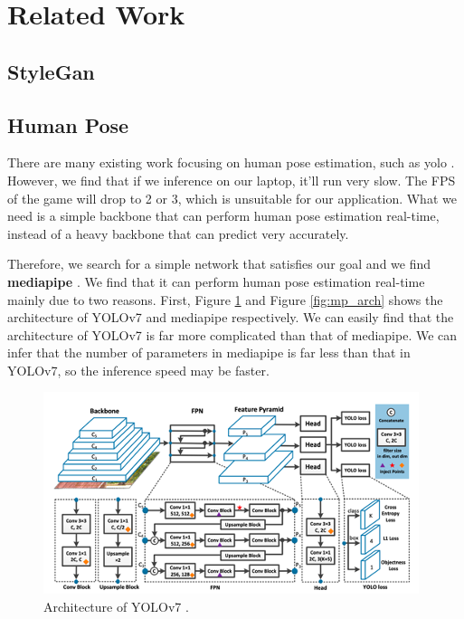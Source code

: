\section{Related Work}
\subsection{StyleGan}

\subsection{Human Pose}
There are many existing work focusing on human pose estimation, such as yolo \cite{yolo1} \cite{yolo2} \cite{yolo3} \cite{wang2022yolov7}. However, we find that if we inference on our laptop, it'll run very slow. The FPS of the game will drop to 2 or 3, which is unsuitable for our application. What we need is a simple backbone that can perform human pose estimation real-time, instead of a heavy backbone that can predict very accurately.

Therefore, we search for a simple network that satisfies our goal and we find \textbf{mediapipe} \cite{lugaresi2019mediapipe}. We find that it can perform human pose estimation real-time mainly due to two reasons. First, Figure \ref{fig:yolo_arch} and Figure \ref{fig:mp_arch} shows the architecture of YOLOv7 and mediapipe respectively. We can easily find that the architecture of YOLOv7 is far more complicated than that of mediapipe. We can infer that the number of parameters in mediapipe is far less than that in YOLOv7, so the inference speed may be faster.

\begin{figure}[ht]
    \centering
    \includegraphics[scale=.55]{fig/yolo_arch.png}
    \caption{Architecture of YOLOv7 \cite{wang2022yolov7}.}
    \label{fig:yolo_arch}
\end{figure}

